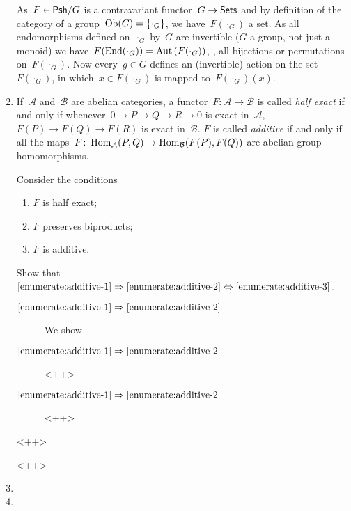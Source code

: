 \documentclass[a4paper,11pt,oneside,openany,article]{memoir}
\begin{document}
\begin{enumerate}
    \begin{solution}
      As~$F\in\mathsf{Psh}/G$ is a contravariant functor~$G\to\textsf{Sets}$ and by definition of the category of a group~$\operatorname{Ob}(G)=\left\{ \cdot_G \right\}$, we have~$F(\cdot_G)$ a set. As all endomorphisms defined on~$\cdot_G$ by~$G$ are invertible ($G$ a group, not just a monoid) we have~$F(\operatorname{End}(\cdot_G))=\operatorname{Aut}\left( F(\cdot_G) \right)$, \ie, all bijections or permutations on~$F(\cdot_G)$. Now every~$g\in G$ defines an (invertible) action on the set~$F(\cdot_G)$, in which~$x\in F(\cdot_G)$ is mapped to~$F(\cdot_G)(x)$.
    \end{solution}

  \item If~$\mathcal{A}$ and~$\mathcal{B}$ are abelian categories, a functor~$F\colon\mathcal{A}\to\mathcal{B}$ is called \emph{half exact} if and only if whenever~$0\to P\to Q\to R\to 0$ is exact in~$\mathcal{A}$, $F(P)\to F(Q)\to F(R)$ is exact in~$\mathcal{B}$. $F$ is called \emph{additive} if and only if all the maps~$F\colon\operatorname{Hom}_{\mathcal{A}}(P,Q)\to\operatorname{Hom}_{\mathcal{B}}(F(P),F(Q))$ are abelian group homomorphisms.

    Consider the conditions
    \begin{enumerate}
      \item\label{enumerate:additive-1} $F$ is half exact;
      \item\label{enumerate:additive-2} $F$ preserves biproducts;
      \item\label{enumerate:additive-3} $F$ is additive.
    \end{enumerate}
    Show that~$\ref{enumerate:additive-1}\Rightarrow\ref{enumerate:additive-2}\Leftrightarrow\ref{enumerate:additive-3}$.

    \begin{solution}
      \begin{description}
        \item[$\ref{enumerate:additive-1}\Rightarrow\ref{enumerate:additive-2}$] We show
        \item[$\ref{enumerate:additive-1}\Rightarrow\ref{enumerate:additive-2}$]<++>
        \item[$\ref{enumerate:additive-1}\Rightarrow\ref{enumerate:additive-2}$]<++>
      \end{description}<++>
    \end{solution}<++>

  \item 

  \item 


\end{enumerate}
\end{document}

